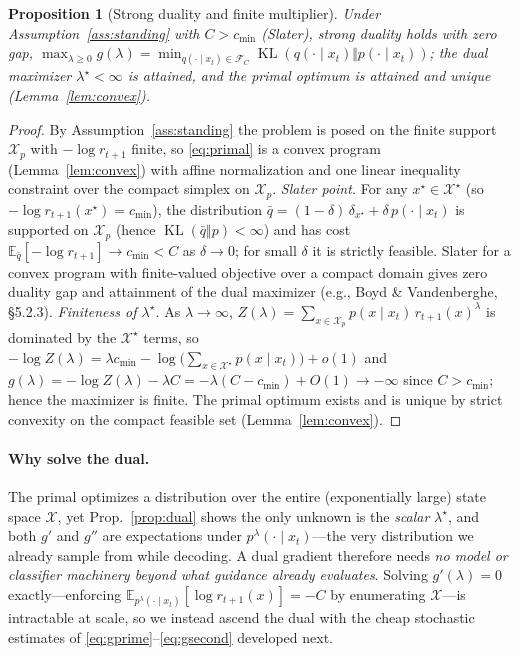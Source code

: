 \documentclass{article}
\newtheorem{proposition}{Proposition}
\DeclareMathOperator{\KL}{KL}
\newcommand{\E}{\mathbb{E}}
\newcommand{\X}{\mathcal{X}}
\newcommand{\lstar}{\lambda^{\star}}
\newcommand{\qlam}{p^{\lambda}(\cdot\mid x_t)}
\begin{document}
\begin{proposition}[Strong duality and finite multiplier]
\label{prop:strongduality}
Under Assumption~\ref{ass:standing} with $C>c_{\min}$ (Slater), strong duality holds with zero gap, $\max_{\lambda\ge0}g(\lambda)=\min_{q(\cdot\mid x_t)\in\mathcal F_C}\KL(q(\cdot\mid x_t)\Vert p(\cdot\mid x_t))$; the dual maximizer $\lstar<\infty$ is attained, and the primal optimum is attained and unique (Lemma~\ref{lem:convex}).
\end{proposition}
\begin{proof}
By Assumption~\ref{ass:standing} the problem is posed on the finite support $\X_p$ with $-\log r_{t+1}$ finite, so \eqref{eq:primal} is a convex program (Lemma~\ref{lem:convex}) with affine normalization and one linear inequality constraint over the compact simplex on $\X_p$. \emph{Slater point.} For any $x^\star\in\X^\star$ (so $-\log r_{t+1}(x^\star)=c_{\min}$), the distribution $\bar q=(1-\delta)\,\delta_{x^\star}+\delta\, p(\cdot\mid x_t)$ is supported on $\X_p$ (hence $\KL(\bar q\Vert p)<\infty$) and has cost $\E_{\bar q}[-\log r_{t+1}]\to c_{\min}<C$ as $\delta\to0$; for small $\delta$ it is strictly feasible. Slater for a convex program with finite-valued objective over a compact domain gives zero duality gap and attainment of the dual maximizer (e.g., Boyd \& Vandenberghe, \S5.2.3). \emph{Finiteness of $\lstar$.} As $\lambda\to\infty$, $Z(\lambda)=\sum_{x\in\X_p}p(x\mid x_t)\,r_{t+1}(x)^\lambda$ is dominated by the $\X^\star$ terms, so $-\log Z(\lambda)=\lambda c_{\min}-\log\!\big(\sum_{x\in\X^\star}p(x\mid x_t)\big)+o(1)$ and $g(\lambda)=-\log Z(\lambda)-\lambda C=-\lambda(C-c_{\min})+O(1)\to-\infty$ since $C>c_{\min}$; hence the maximizer is finite. The primal optimum exists and is unique by strict convexity on the compact feasible set (Lemma~\ref{lem:convex}).
\end{proof}

\paragraph{Why solve the dual.} The primal optimizes a distribution over the entire (exponentially large) state space $\X$, yet Prop.~\ref{prop:dual} shows the only unknown is the \emph{scalar} $\lstar$, and both $g'$ and $g''$ are expectations under $\qlam$---the very distribution we already sample from while decoding. A dual gradient therefore needs \emph{no model or classifier machinery beyond what guidance already evaluates}. Solving $g'(\lambda)=0$ exactly---enforcing $\E_{p^{\lambda}(\cdot\mid x_t)}[\log r_{t+1}(x)]=-C$ by enumerating $\X$---is intractable at scale, so we instead ascend the dual with the cheap stochastic estimates of \eqref{eq:gprime}--\eqref{eq:gsecond} developed next.
\end{document}

